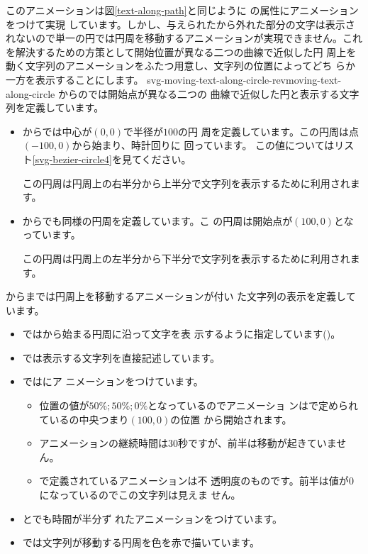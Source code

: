 このアニメーションは図\ref{text-along-path}と同じように
の属性にアニメーションをつけて実現
しています。しかし、与えられたから外れた部分の文字は表示さ
れないので単一の円では円周を移動するアニメーションが実現できません。これ
を解決するための方策として開始位置が異なる二つの\Bezier 曲線で近似した円
周上を動く文字列のアニメーションをふたつ用意し、文字列の位置によってどち
らか一方を表示することにします。
{svg-moving-text-along-circle-rev}{moving-text-along-circle}
からのでは開始点が異なる二つの\Bezier
曲線で近似した円と表示する文字列を定義しています。
\begin{itemize}
 \item {}からでは中心が$(0,0)$で半径が$100$の円
       周を定義しています。この円周は点$(-100,0)$から始まり、時計回りに
       回っています。
       この値についてはリスト\ref{svg-bezier-circle4}を見てください。

この円周は円周上の右半分から上半分で文字列を表示するために利用されます。
 \item {}からでも同様の円周を定義しています。こ
       の円周は開始点が$(100,0)$となっています。

この円周は円周上の左半分から下半分で文字列を表示するために利用されます。
\end{itemize}
からまでは円周上を移動するアニメーションが付い
た文字列の表示を定義しています。
\begin{itemize}
 \item {}ではから始まる円周に沿って文字を表
 示するように指定しています()。
 \item {}では表示する文字列を直接記述しています。
 \item {}ではにア
 ニメーションをつけています。
\begin{itemize}
 \item 位置の値が$50\%;50\%;0\%$となっているのでアニメーショ
 ンはで定められているの中央つまり$(100,0)$の位置
       から開始されます。
 \item アニメーションの継続時間は$30$秒ですが、前半は移動が起きていませ
       ん。
 \item {}で定義されているアニメーションは不
       透明度のものです。前半は値が$0$になっているのでこの文字列は見えま
       せん。
\end{itemize}
 \item {}とでも時間が半分ず
       れたアニメーションをつけています。
 \item {}では文字列が移動する円周を色を赤で描いています。
\end{itemize}
